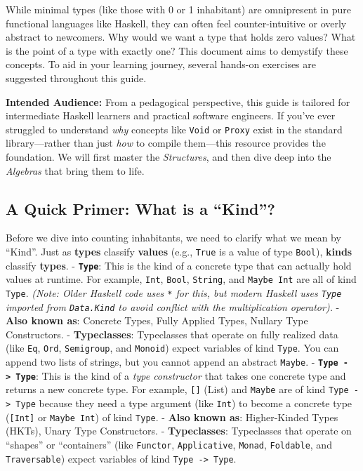 \documentclass[
]{article}
\begin{document}
While minimal types (like those with 0 or 1 inhabitant) are omnipresent
in pure functional languages like Haskell, they can often feel
counter-intuitive or overly abstract to newcomers. Why would we want a
type that holds zero values? What is the point of a type with exactly
one? This document aims to demystify these concepts. To aid in your
learning journey, several hands-on exercises are suggested throughout
this guide.

\textbf{Intended Audience:} From a pedagogical perspective, this guide
is tailored for intermediate Haskell learners and practical software
engineers. If you've ever struggled to understand \emph{why} concepts
like \texttt{Void} or \texttt{Proxy} exist in the standard
library---rather than just \emph{how} to compile them---this resource
provides the foundation. We will first master the \emph{Structures}, and
then dive deep into the \emph{Algebras} that bring them to life.

\subsection{A Quick Primer: What is a
``Kind''?}\label{a-quick-primer-what-is-a-kind}

Before we dive into counting inhabitants, we need to clarify what we
mean by ``Kind''. Just as \textbf{types} classify \textbf{values} (e.g.,
\texttt{True} is a value of type \texttt{Bool}), \textbf{kinds} classify
\textbf{types}. - \textbf{\texttt{Type}}: This is the kind of a concrete
type that can actually hold values at runtime. For example,
\texttt{Int}, \texttt{Bool}, \texttt{String}, and \texttt{Maybe\ Int}
are all of kind \texttt{Type}. \emph{(Note: Older Haskell code uses
\texttt{*} for this, but modern Haskell uses \texttt{Type} imported from
\texttt{Data.Kind} to avoid conflict with the multiplication operator).}
- \textbf{Also known as}: Concrete Types, Fully Applied Types, Nullary
Type Constructors. - \textbf{Typeclasses}: Typeclasses that operate on
fully realized data (like \texttt{Eq}, \texttt{Ord}, \texttt{Semigroup},
and \texttt{Monoid}) expect variables of kind \texttt{Type}. You can
append two lists of strings, but you cannot append an abstract
\texttt{Maybe}. - \textbf{\texttt{Type\ -\textgreater{}\ Type}}: This is
the kind of a \emph{type constructor} that takes one concrete type and
returns a new concrete type. For example, \texttt{{[}{]}} (List) and
\texttt{Maybe} are of kind \texttt{Type\ -\textgreater{}\ Type} because
they need a type argument (like \texttt{Int}) to become a concrete type
(\texttt{{[}Int{]}} or \texttt{Maybe\ Int}) of kind \texttt{Type}. -
\textbf{Also known as}: Higher-Kinded Types (HKTs), Unary Type
Constructors. - \textbf{Typeclasses}: Typeclasses that operate on
``shapes'' or ``containers'' (like \texttt{Functor},
\texttt{Applicative}, \texttt{Monad}, \texttt{Foldable}, and
\texttt{Traversable}) expect variables of kind
\texttt{Type\ -\textgreater{}\ Type}.
\end{document}
